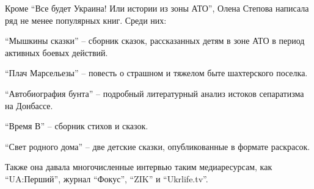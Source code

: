 Кроме “Все будет Украина! Или истории из зоны АТО”, Олена Степова написала ряд не менее популярных книг. Среди них:

    “Мышкины сказки” – сборник сказок, рассказанных детям в зоне АТО в период активных боевых действий.

    “Плач Марсельезы” – повесть о страшном и тяжелом быте шахтерского поселка.

    “Автобиография бунта” – подробный литературный анализ истоков сепаратизма на Донбассе.

    “Время В” – сборник стихов и сказок.

    “Свет родного дома” – две детские сказки, опубликованные в формате раскрасок.

Также она давала многочисленные интервью таким медиаресурсам, как “UA:Перший”, журнал “Фокус”, “ZIK” и “Ukrlife.tv”.

